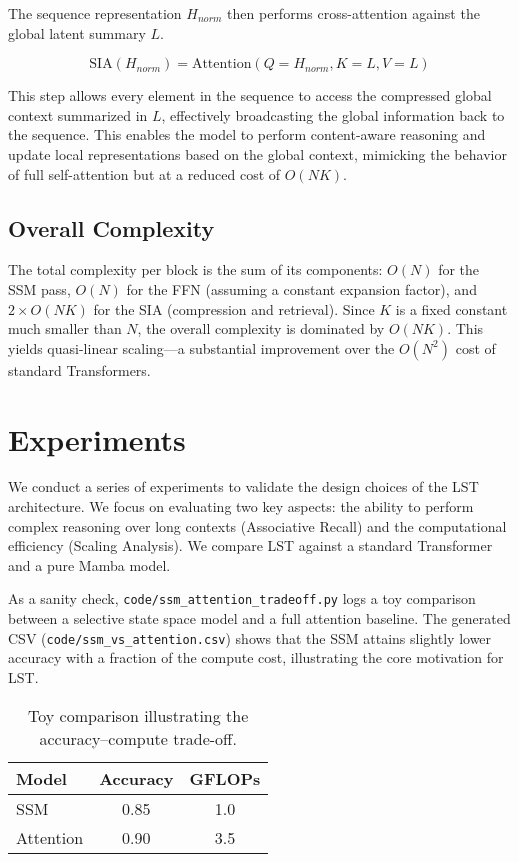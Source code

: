 \documentclass[10pt,twocolumn,letterpaper]{article}
\begin{document}
The sequence representation \(H_{norm}\) then performs cross-attention against the global latent summary \(L\).

\begin{equation}
\text{SIA}(H_{norm}) = \text{Attention}(Q=H_{norm}, K=L, V=L)
\end{equation}

This step allows every element in the sequence to access the compressed global context summarized in \(L\), effectively broadcasting the global information back to the sequence. This enables the model to perform content-aware reasoning and update local representations based on the global context, mimicking the behavior of full self-attention but at a reduced cost of \(O(NK)\).

\subsection{Overall Complexity}

The total complexity per block is the sum of its components: \(O(N)\) for the SSM pass, \(O(N)\) for the FFN (assuming a constant expansion factor), and \(2\times O(NK)\) for the SIA (compression and retrieval). Since \(K\) is a fixed constant much smaller than \(N\), the overall complexity is dominated by \(O(NK)\). This yields quasi-linear scaling—a substantial improvement over the \(O(N^{2})\) cost of standard Transformers.

\section{Experiments}

We conduct a series of experiments to validate the design choices of the LST architecture. We focus on evaluating two key aspects: the ability to perform complex reasoning over long contexts (Associative Recall) and the computational efficiency (Scaling Analysis). We compare LST against a standard Transformer and a pure Mamba model.

As a sanity check, \texttt{code/ssm\_attention\_tradeoff.py} logs a toy comparison between a selective state space model and a full attention baseline. The generated CSV (\texttt{code/ssm\_vs\_attention.csv}) shows that the SSM attains slightly lower accuracy with a fraction of the compute cost, illustrating the core motivation for LST.

\begin{table}[h]
\centering
\begin{tabular}{@{}lcc@{}}
\toprule
Model & Accuracy & GFLOPs \\
\midrule
SSM & 0.85 & 1.0 \\
Attention & 0.90 & 3.5 \\
\bottomrule
\end{tabular}
\caption{Toy comparison illustrating the accuracy--compute trade-off.}
\label{tab:ssm_attn_tradeoff}
\end{table}
\end{document}
